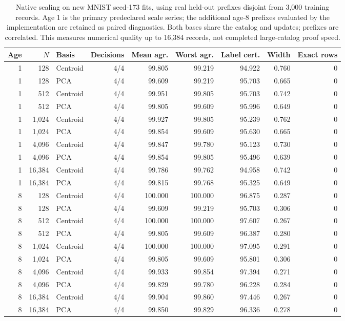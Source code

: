 \begin{table}[tbp]
\centering
\caption{Native scaling on new MNIST seed-173 fits, using real held-out prefixes disjoint from 3,000 training records. Age 1 is the primary predeclared scale series; the additional age-8 prefixes evaluated by the implementation are retained as paired diagnostics. Both bases share the catalog and updates; prefixes are correlated. This measures numerical quality up to 16,384 records, not completed large-catalog proof speed.}
\label{tab:optimized-scale}
\begin{adjustbox}{max width=.98\textwidth,center=\textwidth}
\begin{tabular}{rrlrrrrrr}
\toprule
Age & $N$ & Basis & Decisions & Mean agr. & Worst agr. & Label cert. & Width & Exact rows\\
\midrule
1 & 128 & Centroid & 4/4 & 99.805 & 99.219 & 94.922 & 0.760 & 0\\
1 & 128 & PCA & 4/4 & 99.609 & 99.219 & 95.703 & 0.665 & 0\\
1 & 512 & Centroid & 4/4 & 99.951 & 99.805 & 95.703 & 0.742 & 0\\
1 & 512 & PCA & 4/4 & 99.805 & 99.609 & 95.996 & 0.649 & 0\\
1 & 1,024 & Centroid & 4/4 & 99.927 & 99.805 & 95.239 & 0.762 & 0\\
1 & 1,024 & PCA & 4/4 & 99.854 & 99.609 & 95.630 & 0.665 & 0\\
1 & 4,096 & Centroid & 4/4 & 99.847 & 99.780 & 95.123 & 0.730 & 0\\
1 & 4,096 & PCA & 4/4 & 99.854 & 99.805 & 95.496 & 0.639 & 0\\
1 & 16,384 & Centroid & 4/4 & 99.786 & 99.762 & 94.958 & 0.742 & 0\\
1 & 16,384 & PCA & 4/4 & 99.815 & 99.768 & 95.325 & 0.649 & 0\\
8 & 128 & Centroid & 4/4 & 100.000 & 100.000 & 96.875 & 0.287 & 0\\
8 & 128 & PCA & 4/4 & 99.609 & 99.219 & 95.703 & 0.306 & 0\\
8 & 512 & Centroid & 4/4 & 100.000 & 100.000 & 97.607 & 0.267 & 0\\
8 & 512 & PCA & 4/4 & 99.805 & 99.609 & 96.387 & 0.280 & 0\\
8 & 1,024 & Centroid & 4/4 & 100.000 & 100.000 & 97.095 & 0.291 & 0\\
8 & 1,024 & PCA & 4/4 & 99.805 & 99.609 & 95.801 & 0.306 & 0\\
8 & 4,096 & Centroid & 4/4 & 99.933 & 99.854 & 97.394 & 0.271 & 0\\
8 & 4,096 & PCA & 4/4 & 99.829 & 99.780 & 96.228 & 0.284 & 0\\
8 & 16,384 & Centroid & 4/4 & 99.904 & 99.860 & 97.446 & 0.267 & 0\\
8 & 16,384 & PCA & 4/4 & 99.850 & 99.829 & 96.336 & 0.278 & 0\\
\bottomrule
\end{tabular}
\end{adjustbox}
\end{table}

